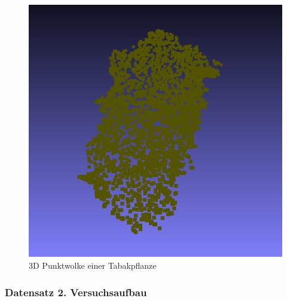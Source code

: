 \documentclass{llncs}
\begin{document}
\begin{figure}[htbp] 
	\centering
	\includegraphics[width=1.2\textwidth]{leaf1.png}
	\caption{3D Punktwolke einer Tabakpflanze}
	\label{fig:Bild2}
\end{figure}

\subsubsection{Datensatz 2. Versuchsaufbau}
\end{document}
